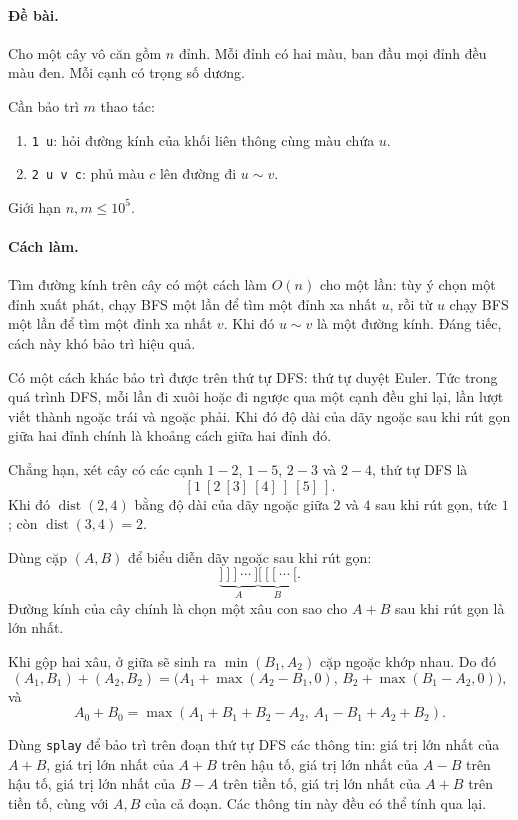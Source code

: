 \documentclass[11pt]{article}
\begin{document}
\paragraph{Đề bài.}
Cho một cây vô căn gồm \(n\) đỉnh. Mỗi đỉnh có hai màu, ban đầu mọi đỉnh đều màu
đen. Mỗi cạnh có trọng số dương.

Cần bảo trì \(m\) thao tác:
\begin{enumerate}
  \item \texttt{1 u}: hỏi đường kính của khối liên thông cùng màu chứa \(u\).
  \item \texttt{2 u v c}: phủ màu \(c\) lên đường đi \(u\sim v\).
\end{enumerate}
Giới hạn \(n,m\le 10^5\).

\paragraph{Cách làm.}
Tìm đường kính trên cây có một cách làm \(O(n)\) cho một lần: tùy ý chọn một
đỉnh xuất phát, chạy BFS một lần để tìm một đỉnh xa nhất \(u\), rồi từ \(u\)
chạy BFS một lần để tìm một đỉnh xa nhất \(v\). Khi đó \(u\sim v\) là một đường
kính. Đáng tiếc, cách này khó bảo trì hiệu quả.

Có một cách khác bảo trì được trên thứ tự DFS: thứ tự duyệt Euler. Tức trong quá
trình DFS, mỗi lần đi xuôi hoặc đi ngược qua một cạnh đều ghi lại, lần lượt viết
thành ngoặc trái và ngoặc phải. Khi đó độ dài của dãy ngoặc sau khi rút gọn giữa
hai đỉnh chính là khoảng cách giữa hai đỉnh đó.

Chẳng hạn, xét cây có các cạnh \(1-2\), \(1-5\), \(2-3\) và
\(2-4\), thứ tự DFS là
\[
  [1\ [2\ [3]\ [4]\ ]\ [5]\ ].
\]
Khi đó \(\operatorname{dist}(2,4)\) bằng độ dài của dãy ngoặc giữa \(2\) và \(4\)
sau khi rút gọn, tức \(1\); còn \(\operatorname{dist}(3,4)=2\).

Dùng cặp \((A,B)\) để biểu diễn dãy ngoặc sau khi rút gọn:
\[
  \underbrace{]\ ]\ ]\ \cdots\ ]}_{A}
  \underbrace{[\ [\ [\ \cdots\ [}_{B}.
\]
Đường kính của cây chính là chọn một xâu con sao cho \(A+B\) sau khi rút gọn là
lớn nhất.

Khi gộp hai xâu, ở giữa sẽ sinh ra \(\min(B_1,A_2)\) cặp ngoặc khớp nhau. Do đó
\[
  (A_1,B_1)+(A_2,B_2)
  =
  \bigl(A_1+\max(A_2-B_1,0),\,
        B_2+\max(B_1-A_2,0)\bigr),
\]
và
\[
  A_0+B_0=
  \max(A_1+B_1+B_2-A_2,\,
       A_1-B_1+A_2+B_2).
\]

Dùng \texttt{splay} để bảo trì trên đoạn thứ tự DFS các thông tin: giá trị lớn
nhất của \(A+B\), giá trị lớn nhất của \(A+B\) trên hậu tố, giá trị lớn nhất của
\(A-B\) trên hậu tố, giá trị lớn nhất của \(B-A\) trên tiền tố, giá trị lớn nhất
của \(A+B\) trên tiền tố, cùng với \(A,B\) của cả đoạn. Các thông tin này đều có
thể tính qua lại.
\end{document}
